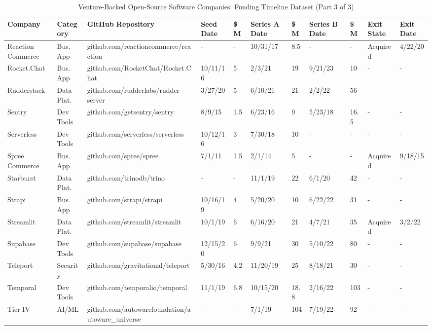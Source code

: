 \begin{landscape}
\begin{table}[htbp]
\centering
\scriptsize
\caption{Venture-Backed Open-Source Software Companies: Funding Timeline Dataset (Part 3 of 3)}
\label{tab:seed_data_3}
\begin{tabular}{|p{2.2cm}|p{1.6cm}|p{4cm}|p{1.1cm}|p{0.9cm}|p{1.1cm}|p{0.9cm}|p{1.1cm}|p{0.9cm}|p{1.3cm}|p{1.1cm}|}
\hline
\textbf{Company} & \textbf{Category} & \textbf{GitHub Repository} & \textbf{Seed Date} & \textbf{\$M} & \textbf{Series A Date} & \textbf{\$M} & \textbf{Series B Date} & \textbf{\$M} & \textbf{Exit State} & \textbf{Exit Date} \\
\hline
Reaction Commerce & Bus. App & github.com/reactioncommerce/reaction & - & - & 10/31/17 & 8.5 & - & - & Acquired & 4/22/20 \\
Rocket.Chat & Bus. App & github.com/RocketChat/Rocket.Chat & 10/11/16 & 5 & 2/3/21 & 19 & 9/21/23 & 10 & - & - \\
Rudderstack & Data Plat. & github.com/rudderlabs/rudder-server & 3/27/20 & 5 & 6/10/21 & 21 & 2/2/22 & 56 & - & - \\
Sentry & Dev Tools & github.com/getsentry/sentry & 8/9/15 & 1.5 & 6/23/16 & 9 & 5/23/18 & 16.5 & - & - \\
Serverless & Dev Tools & github.com/serverless/serverless & 10/12/16 & 3 & 7/30/18 & 10 & - & - & - & - \\
Spree Commerce & Bus. App & github.com/spree/spree & 7/1/11 & 1.5 & 2/1/14 & 5 & - & - & Acquired & 9/18/15 \\
Starburst & Data Plat. & github.com/trinodb/trino & - & - & 11/1/19 & 22 & 6/1/20 & 42 & - & - \\
Strapi & Bus. App & github.com/strapi/strapi & 10/16/19 & 4 & 5/20/20 & 10 & 6/22/22 & 31 & - & - \\
Streamlit & Data Plat. & github.com/streamlit/streamlit & 10/1/19 & 6 & 6/16/20 & 21 & 4/7/21 & 35 & Acquired & 3/2/22 \\
Supabase & Dev Tools & github.com/supabase/supabase & 12/15/20 & 6 & 9/9/21 & 30 & 5/10/22 & 80 & - & - \\
Teleport & Security & github.com/gravitational/teleport & 5/30/16 & 4.2 & 11/20/19 & 25 & 8/18/21 & 30 & - & - \\
Temporal & Dev Tools & github.com/temporalio/temporal & 11/1/19 & 6.8 & 10/15/20 & 18.8 & 2/16/22 & 103 & - & - \\
Tier IV & AI/ML & github.com/autowarefoundation/autoware\_universe & - & - & 7/1/19 & 104 & 7/19/22 & 92 & - & - \\

\end{tabular}
\end{table}
\end{landscape}
